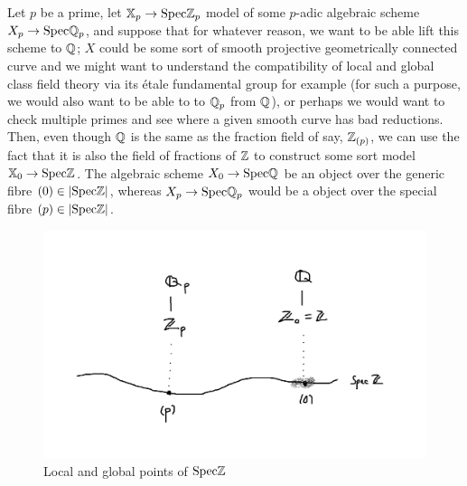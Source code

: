                     \begin{remark} \label{remark: global_models}
                        Let $p$ be a prime, let $\mathbb{X}_p \to \mathrm{Spec} \mathbb{Z}_p$ model of some $p$-adic algebraic scheme $X_p \to \mathrm{Spec} \mathbb{Q}_p$, and suppose that for whatever reason, we want to be able lift this scheme to $\mathbb{Q}$; $X$ could be some sort of smooth projective geometrically connected curve and we might want to understand the compatibility of local and global class field theory via its \'etale fundamental group for example (for such a purpose, we would also want to be able to  to $\mathbb{Q}_p$ from $\mathbb{Q}$), or perhaps we would want to check multiple primes and see where a given smooth curve has bad reductions. Then, even though $\mathbb{Q}$ is the same as the fraction field of say, $\mathbb{Z}_{(p)}$, we can use the fact that it is also the field of fractions of $\mathbb{Z}$ to construct some sort  model $\mathbb{X}_0 \to \mathrm{Spec} \mathbb{Z}$. The algebraic scheme $X_0 \to \mathrm{Spec} \mathbb{Q}$ be an object over the generic fibre $(0) \in |\mathrm{Spec} \mathbb{Z}|$, whereas $X_p \to \mathrm{Spec} \mathbb{Q}_p$ would be a  object over the special fibre $(p) \in |\mathrm{Spec} \mathbb{Z}|$.  
                            \begin{figure}[H]
                                \centering
                                \includegraphics[width=\linewidth,height=\textheight,keepaspectratio]{Figures/places of Spec Z.png}
                                \caption{Local and global points of $\mathrm{Spec} \mathbb{Z}$}
                                \label{fig: local_and_global_points_of_Spec_Z}
                            \end{figure}
                    \end{remark}
